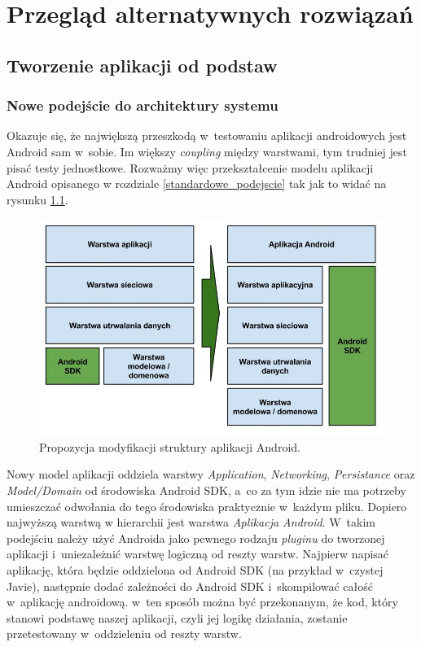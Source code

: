 \chapter{Przegląd alternatywnych rozwiązań}
\label{propozycja_rozwiazania}

\section{Tworzenie aplikacji od podstaw}
\label{nowa_aplikacja}
\subsection{Nowe podejście do architektury systemu}
\label{clean_architecture}
Okazuje się, że największą przeszkodą w~testowaniu aplikacji androidowych jest Android sam w~sobie. Im większy \textit{coupling} między warstwami, tym trudniej jest pisać testy jednostkowe. Rozważmy więc przekształcenie modelu aplikacji Android opisanego w rozdziale \ref{standardowe_podejscie} tak jak to widać na rysunku \ref{fig:opis_rozwiazania}.

\begin{figure}[!htb]
    \centering
    \includegraphics[width=13cm]{imgs/ch4_opis_rozwiazania_1_pl.jpg}
    \caption
{Propozycja modyfikacji struktury aplikacji Android.}
    \label{fig:opis_rozwiazania}
\end{figure} 

Nowy model aplikacji oddziela warstwy \textit{Application}, \textit{Networking}, \textit{Persistance} oraz \textit{Model/Domain} od środowiska Android SDK, a~co za tym idzie nie ma potrzeby umieszczać odwołania do tego środowiska praktycznie w~każdym pliku. Dopiero najwyższą warstwą w hierarchii jest warstwa \textit{Aplikacja Android}. W~takim podejściu należy użyć Androida jako pewnego rodzaju \textit{pluginu} do tworzonej aplikacji i~uniezależnić warstwę logiczną od reszty warstw. Najpierw napisać aplikację, która będzie oddzielona od Android SDK (na przykład w~czystej Javie), następnie dodać zależności do Android SDK i~skompilować całość w~aplikację androidową. w~ten sposób można być przekonanym, że kod, który stanowi podstawę naszej aplikacji, czyli jej logikę działania, zostanie przetestowany w~oddzieleniu od reszty warstw.

